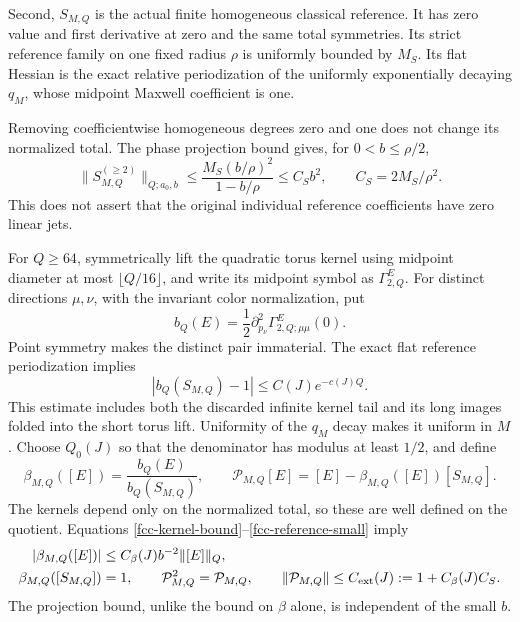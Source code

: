 \documentclass[11pt]{article}
\theoremstyle{remark}
\begin{document}
Second, \(S_{M,Q}\) is the actual finite homogeneous classical
reference. It has zero value and first derivative at zero and
the same total symmetries. Its strict reference family on one
fixed radius \(\rho\) is uniformly bounded by \(M_S\). Its flat
Hessian is the exact relative periodization of the uniformly
exponentially decaying \(q_M\), whose midpoint Maxwell
coefficient is one.

Removing coefficientwise homogeneous degrees zero and one
does not change its normalized total. The phase projection
bound gives, for \(0<b\le\rho/2\),
\begin{equation}
 \|S_{M,Q}^{(\ge2)}\|_{Q;a_0,b}
 \le \frac{M_S(b/\rho)^2}{1-b/\rho}
 \le C_S b^2,\qquad C_S=2M_S/\rho^2.
 \label{fcc-reference-small}
\end{equation}
This does not assert that the original individual reference
coefficients have zero linear jets.

For \(Q\ge64\), symmetrically lift the quadratic torus kernel
using midpoint diameter at most \(\lfloor Q/16\rfloor\), and
write its midpoint symbol as \(\Gamma^E_{2,Q}\). For distinct
directions \(\mu,\nu\), with the invariant color normalization,
put
\begin{equation}
 b_Q(E)=\frac12
       \partial_{p_\nu}^2\Gamma^E_{2,Q;\mu\mu}(0).
 \label{fcc-cutoff-jet}
\end{equation}
Point symmetry makes the distinct pair immaterial. The exact
flat reference periodization implies
\begin{equation}
 |b_Q(S_{M,Q})-1|\le C(J)e^{-c(J)Q}.
 \label{fcc-reference-denominator}
\end{equation}
This estimate includes both the discarded infinite kernel
tail and its long images folded into the short torus lift.
Uniformity of the \(q_M\) decay makes it uniform in \(M\).
Choose \(Q_0(J)\) so that the denominator has modulus at least
\(1/2\), and define
\begin{equation}
 \beta_{M,Q}([E])
     =\frac{b_Q(E)}{b_Q(S_{M,Q})},
 \qquad
 \mathcal P_{M,Q}[E]
     =[E]-\beta_{M,Q}([E])[S_{M,Q}].
 \label{fcc-projection}
\end{equation}
The kernels depend only on the normalized total, so these
are well defined on the quotient. Equations
\eqref{fcc-kernel-bound}--\eqref{fcc-reference-small} imply
\begin{align}
 |\beta_{M,Q}([E])|
     &\le C_\beta(J)b^{-2}\|[E]\|_Q,\notag\\
 \beta_{M,Q}([S_{M,Q}])&=1,\qquad
 \mathcal P_{M,Q}^2=\mathcal P_{M,Q},\qquad
 \|\mathcal P_{M,Q}\|\le C_{\rm ext}(J)
       :=1+C_\beta(J)C_S.
 \label{fcc-projection-bound}
\end{align}
The projection bound, unlike the bound on \(\beta\) alone,
is independent of the small \(b\).
\end{document}
